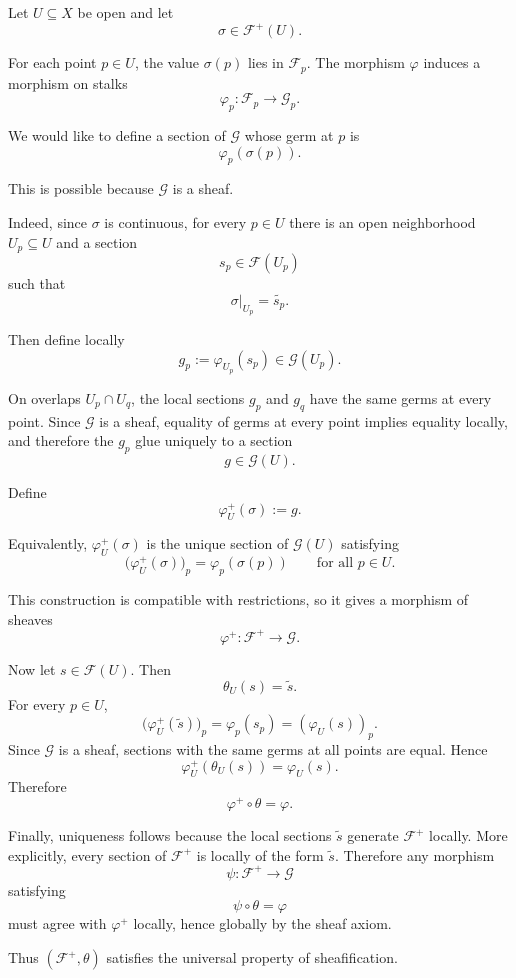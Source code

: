 Let $U \subseteq X$ be open and let
\[
\sigma \in \mathcal F^+(U).
\]

For each point $p \in U$, the value $\sigma(p)$ lies in $\mathcal F_p$.
The morphism $\varphi$ induces a morphism on stalks
\[
\varphi_p : \mathcal F_p \longrightarrow \mathcal G_p.
\]

We would like to define a section of $\mathcal G$ whose germ at $p$ is
\[
\varphi_p(\sigma(p)).
\]

This is possible because $\mathcal G$ is a sheaf.

Indeed, since $\sigma$ is continuous, for every $p \in U$ there is an open
neighborhood $U_p \subseteq U$ and a section
\[
s_p \in \mathcal F(U_p)
\]
such that
\[
\sigma|_{U_p} = \widetilde{s_p}.
\]

Then define locally
\[
g_p := \varphi_{U_p}(s_p) \in \mathcal G(U_p).
\]

On overlaps $U_p \cap U_q$, the local sections $g_p$ and $g_q$ have the same
germs at every point. Since $\mathcal G$ is a sheaf, equality of germs at every
point implies equality locally, and therefore the $g_p$ glue uniquely to a
section
\[
g \in \mathcal G(U).
\]

Define
\[
\varphi^+_U(\sigma) := g.
\]

Equivalently, $\varphi^+_U(\sigma)$ is the unique section of $\mathcal G(U)$
satisfying
\[
\bigl(\varphi^+_U(\sigma)\bigr)_p
=
\varphi_p(\sigma(p))
\qquad
\text{for all } p \in U.
\]

This construction is compatible with restrictions, so it gives a morphism of
sheaves
\[
\varphi^+ : \mathcal F^+ \longrightarrow \mathcal G.
\]

Now let $s \in \mathcal F(U)$. Then
\[
\theta_U(s)=\widetilde{s}.
\]
For every $p \in U$,
\[
\bigl(\varphi^+_U(\widetilde{s})\bigr)_p
=
\varphi_p(s_p)
=
(\varphi_U(s))_p.
\]
Since $\mathcal G$ is a sheaf, sections with the same germs at all points are
equal. Hence
\[
\varphi^+_U(\theta_U(s))
=
\varphi_U(s).
\]
Therefore
\[
\varphi^+ \circ \theta = \varphi.
\]

Finally, uniqueness follows because the local sections $\widetilde{s}$ generate
$\mathcal F^+$ locally. More explicitly, every section of $\mathcal F^+$ is
locally of the form $\widetilde{s}$. Therefore any morphism
\[
\psi : \mathcal F^+ \to \mathcal G
\]
satisfying
\[
\psi \circ \theta = \varphi
\]
must agree with $\varphi^+$ locally, hence globally by the sheaf axiom.

Thus $(\mathcal F^+,\theta)$ satisfies the universal property of
sheafification.

